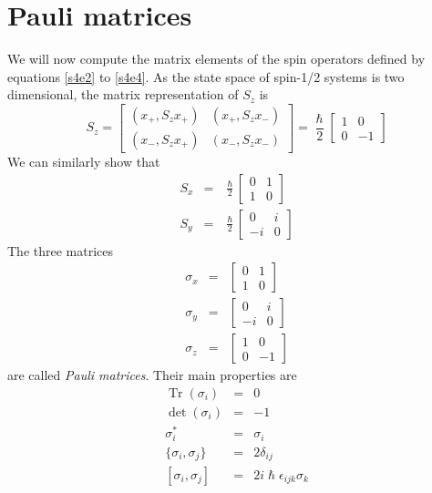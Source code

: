 \documentclass{article}
\numberwithin{equation}{section}
\DeclareMathOperator{\Tr}{Tr}
\begin{document}
\section{Pauli matrices}\label{s5}
We will now compute the matrix elements of the spin operators defined by
equations \eqref{s4e2} to \eqref{s4e4}. As the state space of spin-1/2 systems
is two dimensional, the matrix representation of $S_z$ is
\begin{equation}\label{s5e1}
S_z = \begin{bmatrix} (x_+, S_z x_+) & (x_+, S_z x_-) \\
(x_-, S_z x_+) & (x_-, S_z x_-) 
\end{bmatrix} = \frac{\hslash}{2}\begin{bmatrix} 1 & 0 \\ 0 & -1\end{bmatrix}
\end{equation}
We can similarly show that
\begin{eqnarray}
S_x &=& \frac{\hslash}{2}\begin{bmatrix}0 & 1 \\ 1 & 0 \end{bmatrix}
\label{s5e2} \\
S_y &=& \frac{\hslash}{2}\begin{bmatrix}0 & i \\ -i & 0 \end{bmatrix}
\label{s5e3}
\end{eqnarray}
The three matrices
\begin{eqnarray}
\sigma_x &=& \begin{bmatrix}0 & 1 \\ 1 & 0\end{bmatrix} \label{s5e4} \\
\sigma_y &=& \begin{bmatrix}0 & i \\ -i & 0\end{bmatrix} \label{s5e5} \\
\sigma_z &=& \begin{bmatrix}1 & 0 \\ 0 & -1\end{bmatrix} \label{s5e6}
\end{eqnarray}
are called \emph{Pauli matrices}. Their main properties are
\begin{eqnarray}
\Tr(\sigma_i) &=& 0 \label{s5e7} \\
\det(\sigma_i) &=& -1 \label{s5e8} \\
\sigma_i^\ast &=& \sigma_i \label{s5e9} \\
\{\sigma_i, \sigma_j\} &=& 2\delta_{ij} \label{s5e10} \\
{}[\sigma_i, \sigma_j] &=& 2i\hslash\epsilon_{ijk}\sigma_k \label{s5e11}
\end{eqnarray}
\end{document}
